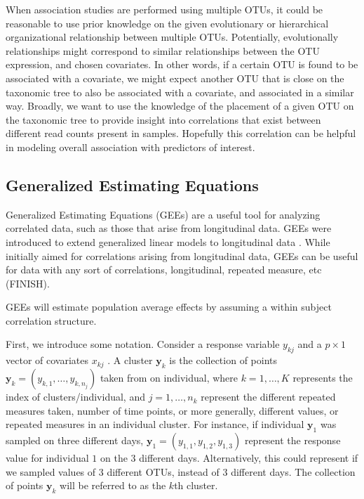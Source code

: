 \documentclass[12pt]{article}
\begin{document}
\cite{washburne2018methods}

When association studies are performed using multiple OTUs, it could be reasonable to use prior knowledge on the given evolutionary or hierarchical organizational relationship between multiple OTUs. Potentially, evolutionally relationships might correspond to similar relationships between the OTU expression, and chosen covariates. In other words, if a certain OTU is found to be associated with a covariate, we might expect another OTU that is close on the taxonomic tree to also be associated with a covariate, and associated in a similar way. Broadly, we want to use the knowledge of the placement of a given OTU on the taxonomic tree to provide insight into correlations that exist between different read counts present in samples. Hopefully this correlation can be helpful in modeling overall association with predictors of interest.





\subsection{Generalized Estimating Equations}

Generalized Estimating Equations (GEEs) are a useful tool for analyzing correlated data, such as those that arise from longitudinal data. GEEs were introduced to extend generalized linear models to longitudinal data \cite{liang1986longitudinal}. While initially aimed for correlations arising from longitudinal data, GEEs can be useful for data with any sort of correlations, longitudinal, repeated measure, etc (FINISH).

GEEs will estimate population average effects by assuming a within subject correlation structure.

First, we introduce some notation. Consider a response variable $y_{kj}$ and  a $p \times 1$ vector of covariates $x_{kj}$
. A cluster $\mathbf{y}_k$ is the collection of points $\mathbf{y}_k = (y_{k,1}, \ldots , y_{k,n_j})$ taken from on individual, where $k = 1, \ldots , K$ represents the index of clusters/individual, and $j = 1, \ldots , n_k$ represent the different repeated measures taken, number of time points, or more generally, different values, or repeated measures in an individual cluster. For instance, if individual $\mathbf{y}_1$ was sampled on three different days, $\mathbf{y}_1 = (y_{1,1}, y_{1,2}, y_{1,3})$ represent the response value for individual $1$ on the 3 different days. Alternatively, this could represent if we sampled values of 3 different OTUs, instead of 3 different days. The collection of points $\mathbf{y}_k$ will be referred to as the $k$th cluster.
\end{document}
